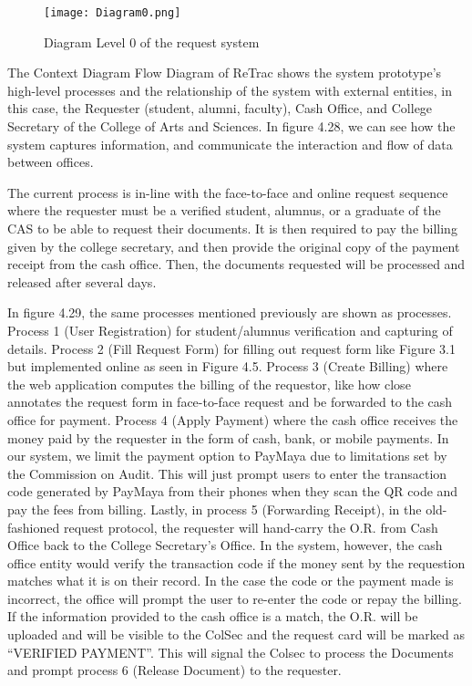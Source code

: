     \begin{figure}[h]
        \centering 
        \begin{minipage}[c]{0.7\linewidth}
            \centering
            \texttt{[image: Diagram0.png]}
            \caption{Diagram Level 0 of the request system}
            \label{fig:Diagram0}
        \end{minipage}
    \end{figure}
    
The Context Diagram Flow Diagram of ReTrac shows the system prototype’s high-level processes and the relationship of the system with external entities, in this case, the Requester (student, alumni, faculty), Cash Office, and College Secretary of the College of Arts and Sciences. In figure 4.28, we can see how the system captures information, and communicate the interaction and flow of data between offices. 

The current process is in-line with the face-to-face and online request sequence where the requester must be a verified student, alumnus, or a graduate of the CAS to be able to request their documents. It is then required to pay the billing given by the college secretary, and then provide the original copy of the payment receipt from the cash office. Then, the documents requested will be processed and released after several days. 

In figure 4.29, the same processes mentioned previously are shown as processes. Process 1 (User Registration) for student/alumnus verification and capturing of details. Process 2 (Fill Request Form) for filling out request form like Figure 3.1 but implemented online as seen in Figure 4.5. Process 3 (Create Billing) where the web application computes the billing of the requestor, like how close annotates the request form in face-to-face request and be forwarded to the cash office for payment. Process 4 (Apply Payment) where the cash office receives the money paid by the requester in the form of cash, bank, or mobile payments. In our system, we limit the payment option to PayMaya due to limitations set by the Commission on Audit. This will just prompt users to enter the transaction code generated by PayMaya from their phones when they scan the QR code and pay the fees from billing. Lastly, in process 5 (Forwarding Receipt), in the old-fashioned request protocol, the requester will hand-carry the O.R. from Cash Office back to the College Secretary’s Office. In the system, however, the cash office entity would verify the transaction code if the money sent by the requestion matches what it is on their record. In the case the code or the payment made is incorrect, the office will prompt the user to re-enter the code or repay the billing. If the information provided to the cash office is a match, the O.R. will be uploaded and will be visible to the ColSec and the request card will be marked as “VERIFIED PAYMENT”. This will signal the Colsec to process the Documents and prompt process 6 (Release Document) to the requester. 

